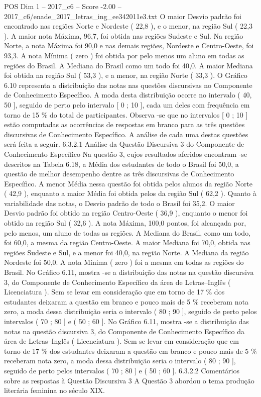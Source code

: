 \begin{textsample}{POS Dim 1 – 2017\_c6 – Score -2.00 – 2017\_c6/enade\_2017\_letras\_ing\_ee342011e3.txt}
O maior Desvio padrão foi encontrado nas regiões Norte e Nordeste ( 22,8 ), e o menor, na região Sul ( 22,3 ).
A maior nota Máxima, 96,7, foi obtida nas regiões Sudeste e Sul.
Na região Norte, a nota Máxima foi 90,0 e nas demais regiões, Nordeste e Centro-Oeste, foi 93,3.
A nota Mínima ( zero ) foi obtida por pelo menos um aluno em todas as regiões do Brasil.
A Mediana do Brasil como um todo foi 40,0.
A maior Mediana foi obtida na região Sul ( 53,3 ), e a menor, na região Norte ( 33,3 ).
O Gráfico 6.10 representa a distribuição das notas nas questões discursivas no Componente de Conhecimento Específico.
A moda desta distribuição ocorre no intervalo ( 40, 50 ], seguido de perto pelo intervalo [ 0 ; 10 ], cada um deles com frequência em torno de 15 \% do total de participantes.
Observa -se que no intervalos [ 0 ; 10 ] estão computadas as ocorrências de respostas em branco para as três questões discursivas de Conhecimento Específico.
A análise de cada uma destas questões será feita a seguir. 6.3.2.1 Análise da Questão Discursiva 3 do Componente de Conhecimento Específico Na questão 3, cujos resultados aferidos encontram -se descritos na Tabela 6.18, a Média dos estudantes de todo o Brasil foi 50,0, a questão de melhor desempenho dentre as três discursivas de Conhecimento Específico.
A menor Média nessa questão foi obtida pelos alunos da região Norte ( 42,9 ), enquanto a maior Média foi obtida pelos da região Sul ( 62,2 ).
Quanto à variabilidade das notas, o Desvio padrão de todo o Brasil foi 35,2.
O maior Desvio padrão foi obtido na região Centro-Oeste ( 36,9 ), enquanto o menor foi obtido na região Sul ( 32,6 ).
A nota Máxima, 100,0 pontos, foi alcançada por, pelo menos, um aluno de todas as regiões.
A Mediana do Brasil, como um todo, foi 60,0, a mesma da região Centro-Oeste.
A maior Mediana foi 70,0, obtida nas regiões Sudeste e Sul, e a menor foi 40,0, na região Norte.
A Mediana da região Nordeste foi 50,0.
A nota Mínima ( zero ) foi a mesma em todas as regiões do Brasil.
No Gráfico 6.11, mostra -se a distribuição das notas na questão discursiva 3, do Componente de Conhecimento Específico da área de Letras–Inglês ( Licenciatura ).
Sem se levar em consideração que em torno de 17 \% dos estudantes deixaram a questão em branco e pouco mais de 5 \% receberam nota zero, a moda dessa distribuição seria o intervalo ( 80 ; 90 ], seguido de perto pelos intervalos ( 70 ; 80 ] e ( 50 ; 60 ].
No Gráfico 6.11, mostra -se a distribuição das notas na questão discursiva 3, do Componente de Conhecimento Específico da área de Letras–Inglês ( Licenciatura ).
Sem se levar em consideração que em torno de 17 \% dos estudantes deixaram a questão em branco e pouco mais de 5 \% receberam nota zero, a moda dessa distribuição seria o intervalo ( 80 ; 90 ], seguido de perto pelos intervalos ( 70 ; 80 ] e ( 50 ; 60 ]. 6.3.2.2 Comentários sobre as respostas à Questão Discursiva 3 A Questão 3 abordou o tema produção literária feminina no século XIX.

\end{textsample}
